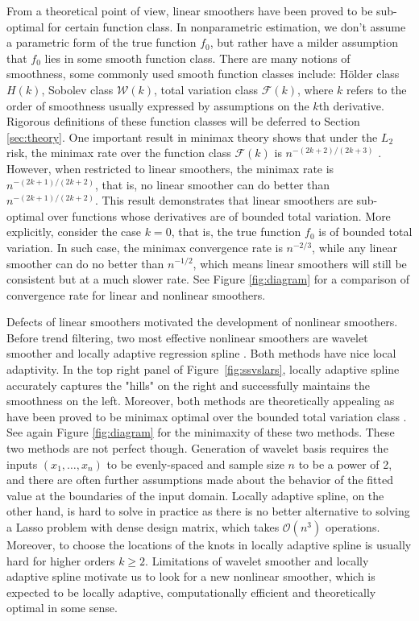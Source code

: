 \documentclass[a4paper]{article}
\renewcommand{\cal}{\mathcal}
\begin{document}
From a theoretical point of view, linear smoothers have been proved to be sub-optimal for certain function class. In nonparametric estimation, we don't assume a parametric form of the true function $f_0$, but rather have a milder assumption that $f_0$ lies in some smooth function class. There are many notions of smoothness, some commonly used smooth function classes include: H\"older class $H(k)$, Sobolev class $\cal{W}(k)$, total variation class $\cal{F}(k)$, where $k$ refers to the order of smoothness usually expressed by assumptions on the $k$th derivative. Rigorous definitions of these function classes will be deferred to Section \ref{sec:theory}. One important result in minimax theory shows that under the $L_2$ risk, the minimax rate over the function class $\cal{F}(k)$ is $n^{-(2k+2)/(2k+3)}$ \cite{donoho1998minimax}. However, when restricted to linear smoothers, the minimax rate is $n^{-(2k+1)/(2k+2)}$, that is, no linear smoother can do better than $n^{-(2k+1)/(2k+2)}$. This result demonstrates that linear smoothers are sub-optimal over functions whose derivatives are of bounded total variation. More explicitly, consider the case $k = 0$, that is, the true function $f_0$ is of bounded total variation. In such case, the minimax convergence rate is $n^{-2/3}$, while any linear smoother can do no better than $n^{-1/2}$, which means linear smoothers will still be consistent but at a much slower rate. See Figure \ref{fig:diagram} for a comparison of convergence rate for linear and nonlinear smoothers.

Defects of linear smoothers motivated the development of nonlinear smoothers. Before trend filtering, two most effective nonlinear smoothers are wavelet smoother \cite{johnstone2011gaussian,mallat2008wavelet,donoho1994ideal} and locally adaptive regression spline \cite{mammen1997locally}. Both methods have nice local adaptivity. In the top right panel of Figure~\ref{fig:ssvslars}, locally adaptive spline accurately captures the "hills" on the right and successfully maintains the smoothness on the left. Moreover, both methods are theoretically appealing as have been proved to be minimax optimal over the bounded total variation class \cite{donoho1998minimax,mammen1997locally}. See again Figure \ref{fig:diagram} for the minimaxity of these two methods. These two methods are not perfect though. Generation of wavelet basis requires the inputs $(x_1, \ldots, x_n)$ to be evenly-spaced and sample size $n$ to be a power of 2, and there are often further assumptions made about the behavior of the fitted value at the boundaries of the input domain. Locally adaptive spline, on the other hand, is hard to solve in practice as there is no better alternative to solving a Lasso problem with dense design matrix, which takes $\cal{O}(n^3)$ operations. Moreover, to choose the locations of the knots in locally adaptive spline is usually hard for higher orders $k\geq 2$. Limitations of wavelet smoother and locally adaptive spline motivate us to look for a new nonlinear smoother, which is expected to be locally adaptive, computationally efficient and theoretically optimal in some sense.
\end{document}
